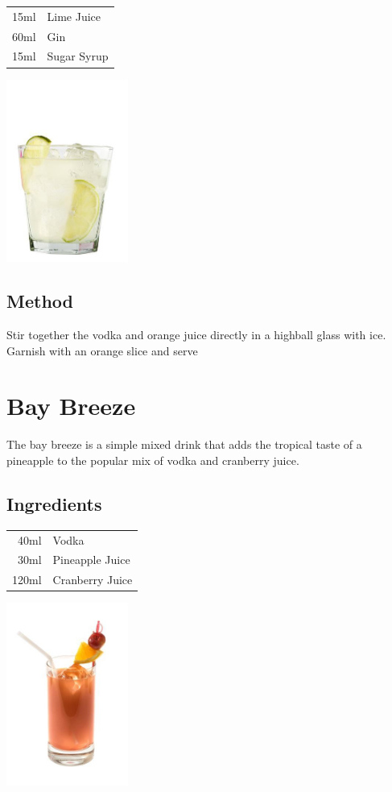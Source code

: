 \documentclass[12pt, letterpaper]{article}
\begin{document}
\begin{multicols}{2}

\begin{tabular} { r | l}
    15ml & Lime Juice \\
    60ml & Gin  \\
    15ml & Sugar Syrup  \\
\end{tabular}

\includegraphics[height=6cm]{gimlet}

\end{multicols}

\subsection*{Method}
Stir together the vodka and orange juice directly in a highball glass with ice.
Garnish with an orange slice and serve

\pagebreak
\section{Bay Breeze}
The bay breeze is a simple mixed drink that adds the tropical taste of a pineapple to the popular mix of vodka and cranberry juice.
\subsection*{Ingredients}

\begin{multicols}{2}

\begin{tabular} { r | l}
    40ml & Vodka \\
    30ml & Pineapple Juice  \\
    120ml & Cranberry Juice  \\
\end{tabular}

\includegraphics[height=6cm]{baybreeze}

\end{multicols}
\end{document}
